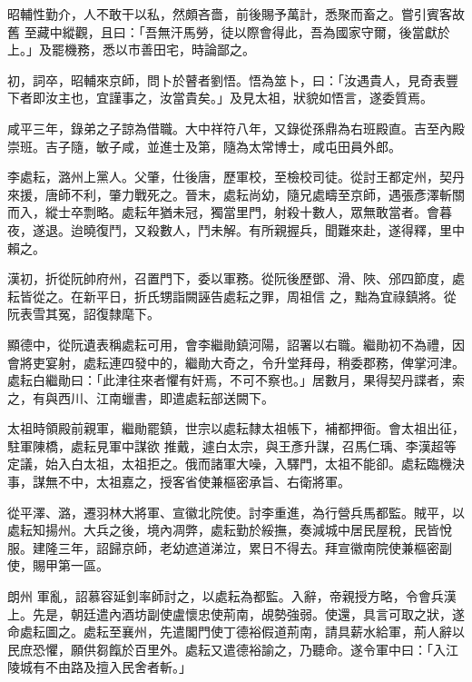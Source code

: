\begin{pinyinscope}
 昭輔性勤介，人不敢干以私，然頗吝嗇，前後賜予萬計，悉聚而畜之。嘗引賓客故舊
 至藏中縱觀，且曰：「吾無汗馬勞，徒以際會得此，吾為國家守爾，後當獻於上。」及罷機務，悉以市善田宅，時論鄙之。



 初，詞卒，昭輔來京師，問卜於瞽者劉悟。悟為筮卜，曰：「汝遇貴人，見奇表豐下者即汝主也，宜謹事之，汝當貴矣。」及見太祖，狀貌如悟言，遂委質焉。



 咸平三年，錄弟之子諒為借職。大中祥符八年，又錄從孫鼎為右班殿直。吉至內殿崇班。吉子隨，敏子咸，並進士及第，隨為太常博士，咸屯田員外郎。



 李處耘，潞州上黨人。父肇，仕後唐，歷軍校，至檢校司徒。從討王都定州，契丹來援，唐師不利，肇力戰死之。晉末，處耘尚幼，隨兄處疇至京師，遇張彥澤斬關而入，縱士卒剽略。處耘年猶未冠，獨當里門，射殺十數人，眾無敢當者。會暮夜，遂退。迨曉復鬥，又殺數人，鬥未解。有所親握兵，聞難來赴，遂得釋，里中賴之。



 漢初，折從阮帥府州，召置門下，委以軍務。從阮後歷鄧、滑、陜、邠四節度，處耘皆從之。在新平日，折氏甥詣闕誣告處耘之罪，周祖信
 之，黜為宜祿鎮將。從阮表雪其冤，詔復隸麾下。



 顯德中，從阮遺表稱處耘可用，會李繼勛鎮河陽，詔署以右職。繼勛初不為禮，因會將吏宴射，處耘連四發中的，繼勛大奇之，令升堂拜母，稍委郡務，俾掌河津。處耘白繼勛曰：「此津往來者懼有奸焉，不可不察也。」居數月，果得契丹諜者，索之，有與西川、江南蠟書，即遣處耘部送闕下。



 太祖時領殿前親軍，繼勛罷鎮，世宗以處耘隸太祖帳下，補都押衙。會太祖出征，駐軍陳橋，處耘見軍中謀欲
 推戴，遽白太宗，與王彥升謀，召馬仁瑀、李漢超等定議，始入白太祖，太祖拒之。俄而諸軍大噪，入驛門，太祖不能卻。處耘臨機決事，謀無不中，太祖嘉之，授客省使兼樞密承旨、右衛將軍。



 從平澤、潞，遷羽林大將軍、宣徽北院使。討李重進，為行營兵馬都監。賊平，以處耘知揚州。大兵之後，境內凋弊，處耘勤於綏撫，奏減城中居民屋稅，民皆悅服。建隆三年，詔歸京師，老幼遮道涕泣，累日不得去。拜宣徽南院使兼樞密副使，賜甲第一區。



 朗州
 軍亂，詔慕容延釗率師討之，以處耘為都監。入辭，帝親授方略，令會兵漢上。先是，朝廷遣內酒坊副使盧懷忠使荊南，覘勢強弱。使還，具言可取之狀，遂命處耘圖之。處耘至襄州，先遣閣門使丁德裕假道荊南，請具薪水給軍，荊人辭以民庶恐懼，願供芻餼於百里外。處耘又遣德裕諭之，乃聽命。遂令軍中曰：「入江陵城有不由路及擅入民舍者斬。」




\end{pinyinscope}
